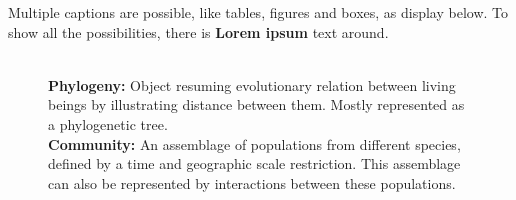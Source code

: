 \documentclass[12pt,a4paper,notitlepage,colorinlistoftodos]{article}
\newcommand{\defi}[2]{\textbf{#1: }{#2}}
\begin{document}
Multiple captions are possible, like tables, figures and boxes, as display below. To show all the possibilities, there is \textbf{Lorem ipsum} text around. 

\begin{figure}
\begin{wordbox}
 \\ \defi{Phylogeny}{Object resuming evolutionary relation between living beings by illustrating distance between them. Mostly represented as a phylogenetic tree.}\\
\defi{Community}{An assemblage of populations from different species, defined by a time and geographic scale restriction. This assemblage can also be represented by interactions between these populations.}\\
\end{wordbox}
\end{figure}

\lipsum[1-3]
\end{document}

